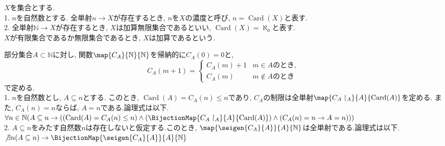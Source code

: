 \begin{definition}[p184の定義7.1.3]
	\label{definition:合論的な自然数の定義}
	$X$を集合とする.\\
	1. $n$を自然数とする.
	全単射$n \rightarrow X$が存在するとき,
	$n$を$X$の濃度と呼び,
	$n=\operatorname{Card}(X)$と表す.\\
	2. 全単射$\mathbb{N} \rightarrow X$が存在するとき,
	$X$は加算無限集合であるといい,
	$\operatorname{Card}(X)=\aleph_0$と表す.\\
	$X$が有限集合であるか無限集合であるとき,
	$X$は加算であるという.
\end{definition}

\begin{proposition}[p185の命題7.1.5]
	部分集合$A \subset \mathbb{N}$に対し,
	関数$\map{C_A}{\mathbb{N}}{\mathbb{N}}$を帰納的に$C_A(0)=0$と,
  \begin{equation*}
    C_A(m + 1)=
    \begin{cases}
      C_A(m) + 1 & m \in A\text{のとき},\\
      C_A(m)  & m \not\in A \text{のとき}
    \end{cases}
  \end{equation*}
  で定める.\\
  1. $n$を自然数とし,
  $A \subseteq n$とする.
  このとき,
  $\operatorname{Card}(A)=C_A(n) \leq n$であり,
  $C_A$の制限は全単射$\map{C_A\restriction_{{A}}}{A}{\operatorname{Card}(A)}$を定める.
  また,
  $C_A(n)=n$ならば,
  $A=n$である.論理式は以下.\\
 $\forall n \in \mathbb{N}(A \subseteq n \rightarrow ((\operatorname{Card}(A)=C_A(n) \leq n ) \land (\BijectionMap{C_A\restriction_{{A}}}{A}{\operatorname{Card}(A)}
 ) \land (C_A(n) = n \rightarrow A=n)))$\\
 2. $A \subseteq n$をみたす自然数$n$は存在しないと仮定する.このとき,
 $\map {\seigen {C_A}{A}}{A}{\mathbb{N}}$は全単射である.論理式は以下.\\
 $\not \exists n (A \subseteq n) \rightarrow \BijectionMap{\seigen{C_A}{A}}{A}{\mathbb{N}}$
 
\end{proposition}

